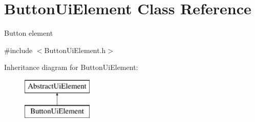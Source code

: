 \hypertarget{class_button_ui_element}{}\section{Button\+Ui\+Element Class Reference}
\label{class_button_ui_element}


Button element  




{\ttfamily \#include $<$Button\+Ui\+Element.\+h$>$}

Inheritance diagram for Button\+Ui\+Element\+:\begin{figure}[H]
\begin{center}
\leavevmode
\includegraphics[height=2.000000cm]{class_button_ui_element}
\end{center}
\end{figure}
